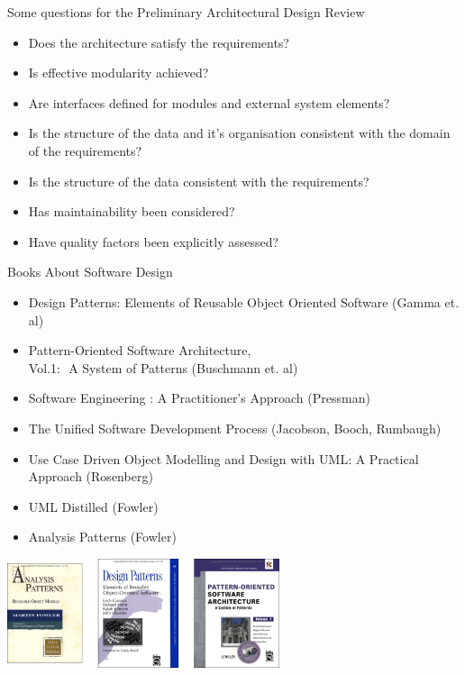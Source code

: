 \documentclass[aspectratio=1610,xcolor=dvipsnames,t,compress]{beamer}
\begin{document}
\begin{frame}{Some questions for the Preliminary Architectural Design Review} 
    \begin{itemize}
        \item Does the architecture satisfy the requirements?
        \item Is effective modularity achieved? 
        \item Are interfaces defined for modules and external system elements?
        \item Is the structure of the data and it’s organisation consistent 
              with the domain of the requirements?
        \item Is the structure of the data consistent with the requirements?
        \item Has maintainability been considered?
        \item Have quality factors been explicitly assessed?
    \end{itemize}
\end{frame} 

\begin{frame}{Books About Software Design}
    \begin{itemize}
        \item Design Patterns: Elements of Reusable Object Oriented Software (Gamma et. al)
        \item Pattern-Oriented Software Architecture, \\ Vol.1:  A System of Patterns (Buschmann et. al)
        \item Software Engineering : A Practitioner’s Approach (Pressman)
        \item The Unified Software Development Process (Jacobson, Booch, Rumbaugh)
        \item Use Case Driven Object Modelling and Design with UML: A Practical Approach (Rosenberg)
        \item UML Distilled (Fowler)
        \item Analysis Patterns (Fowler)
    \end{itemize} 
    \begin{center}
        \includegraphics[width=0.6\textwidth]{books} 
    \end{center}
\end{frame} 
\end{document}
